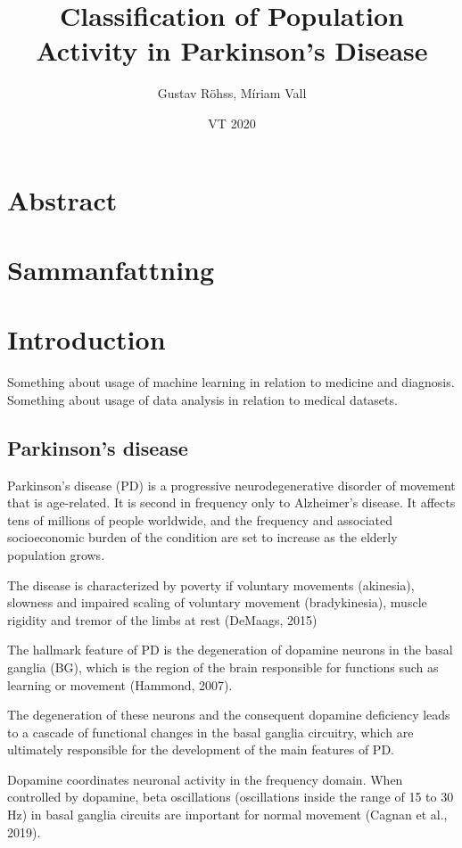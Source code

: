 \documentclass{article}
\title{Classification of Population Activity in Parkinson's Disease}
\author{Gustav Röhss, Míriam Vall}
\date{VT 2020}
\begin{document}
\maketitle

\section*{Abstract}
\section*{Sammanfattning}

\newpage
\tableofcontents

\newpage
\section{Introduction}
Something about usage of machine learning in relation to medicine and diagnosis.
Something about usage of data analysis in relation to medical datasets.

\subsection{Parkinson's disease}
Parkinson’s disease (PD) is a progressive neurodegenerative disorder of movement that is age-related. It is second in frequency only to Alzheimer’s disease. It affects tens of millions of people worldwide, and the frequency and associated socioeconomic burden of the condition are set to increase as the elderly population grows.

The disease is characterized by poverty if voluntary movements (akinesia), slowness and impaired scaling of voluntary movement (bradykinesia), muscle rigidity and tremor of the limbs at rest (DeMaags, 2015)

The hallmark feature of PD is the degeneration of dopamine neurons in the basal ganglia (BG), which is the region of the brain responsible for functions such as learning or movement (Hammond, 2007).

The degeneration of these neurons and the consequent dopamine deficiency leads to a cascade of functional changes in the basal ganglia circuitry, which are ultimately responsible for the development of the main features of PD. 

Dopamine coordinates neuronal activity in the frequency domain. When controlled by dopamine, beta oscillations (oscillations inside the range of 15 to 30 Hz) in basal ganglia circuits are important for normal movement (Cagnan et al., 2019). 
\end{document}
